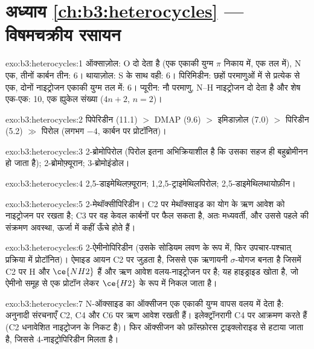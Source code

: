 \section*{अध्याय \ref{ch:b3:heterocycles} --- विषमचक्रीय रसायन}

\begin{solution}{exo:b3:heterocycles:1}
ऑक्साज़ोल: O दो देता है (एक एकाकी युग्म $\pi$ निकाय में, एक तल में), N एक,
तीनों कार्बन तीन: 6। थायाज़ोल: S के साथ वही: 6। पिरिमिडीन: छहों परमाणुओं में से
प्रत्येक से एक, दोनों नाइट्रोजन एकाकी युग्म तल में: 6। प्यूरीन: नौ परमाणु,
N--H नाइट्रोजन दो देता है और शेष एक-एक: 10, एक ह्युकेल संख्या
($4n + 2$, $n = 2$)।
\end{solution}

\begin{solution}{exo:b3:heterocycles:2}
पिपेरिडीन (11.1) $>$ DMAP (9.6) $>$ इमिडाज़ोल (7.0) $>$ पिरिडीन (5.2) $\gg$ पिरोल (लगभग $-4$,
कार्बन पर प्रोटॉनित)।
\end{solution}

\begin{solution}{exo:b3:heterocycles:3}
2-ब्रोमोपिरोल (पिरोल इतना अभिक्रियाशील है कि उसका सहज ही बहुब्रोमीनन हो जाता है);
2-ब्रोमोफ़्यूरान; 3-ब्रोमोइंडोल।
\end{solution}

\begin{solution}{exo:b3:heterocycles:4}
2,5-डाइमेथिलफ़्यूरान; 1,2,5-ट्राइमेथिलपिरोल; 2,5-डाइमेथिलथायोफ़ीन।
\end{solution}

\begin{solution}{exo:b3:heterocycles:5}
2-मेथॉक्सीपिरिडीन। C2 पर मेथॉक्साइड का योग  के ऋण आवेश को
नाइट्रोजन पर रखता है; C3 पर वह केवल कार्बनों पर फैल सकता है, अतः
मध्यवर्ती, और उससे पहले की संक्रमण अवस्था, ऊर्जा में कहीं ऊँचे होते हैं।
\end{solution}

\begin{solution}{exo:b3:heterocycles:6}
2-ऐमीनोपिरिडीन (उसके सोडियम लवण के रूप में, फिर उपचार-पश्चात् प्रक्रिया में प्रोटॉनित)। ऐमाइड आयन
C2 पर जुड़ता है, जिससे एक ऋणायनी $\sigma$-योगज बनता है जिसमें C2 पर H और $\ce{NH2}$ हैं और ऋण
आवेश वलय-नाइट्रोजन पर है; यह हाइड्राइड खोता है, जो
ऐमीनो समूह से एक प्रोटॉन लेकर $\ce{H2}$ के रूप में निकल जाता है।
\end{solution}

\begin{solution}{exo:b3:heterocycles:7}
N-ऑक्साइड का ऑक्सीजन एक एकाकी युग्म वापस वलय में देता है: अनुनादी
संरचनाएँ C2, C4 और C6 पर ऋण आवेश रखती हैं। इलेक्ट्रॉनरागी C4 पर आक्रमण करते हैं (C2
धनावेशित नाइट्रोजन के निकट है)। फिर ऑक्सीजन को
फ़ॉस्फ़ोरस ट्राइक्लोराइड से हटाया जाता है, जिससे 4-नाइट्रोपिरिडीन मिलता है।
\end{solution}

